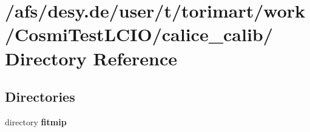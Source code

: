 \section{/afs/desy.de/user/t/torimart/work/CosmiTestLCIO/calice\_\-calib/ Directory Reference}
\label{dir_5116c8f7e4b5645f509e1533a2a6cce8}
\subsection*{Directories}
\begin{DoxyCompactItemize}
\item 
directory {\bf fitmip}
\end{DoxyCompactItemize}
